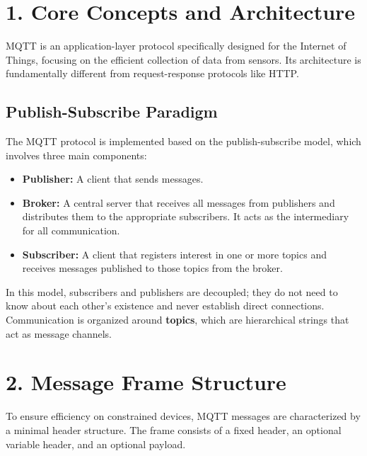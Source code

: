 \documentclass[a4paper, 12pt]{book} %
\begin{document}
\section{1. Core Concepts and
Architecture}\label{core-concepts-and-architecture}

MQTT is an application-layer protocol specifically designed for the
Internet of Things, focusing on the efficient collection of data from
sensors. Its architecture is fundamentally different from
request-response protocols like HTTP.

\subsection{Publish-Subscribe
Paradigm}\label{publish-subscribe-paradigm}

The MQTT protocol is implemented based on the publish-subscribe model,
which involves three main components:

\begin{itemize}
\tightlist
\item
  \textbf{Publisher:} A client that sends messages.
\item
  \textbf{Broker:} A central server that receives all messages from
  publishers and distributes them to the appropriate subscribers. It
  acts as the intermediary for all communication.
\item
  \textbf{Subscriber:} A client that registers interest in one or more
  topics and receives messages published to those topics from the
  broker.
\end{itemize}

In this model, subscribers and publishers are decoupled; they do not
need to know about each other's existence and never establish direct
connections. Communication is organized around \textbf{topics}, which
are hierarchical strings that act as message channels.

\section{2. Message Frame Structure}\label{message-frame-structure}

To ensure efficiency on constrained devices, MQTT messages are
characterized by a minimal header structure. The frame consists of a
fixed header, an optional variable header, and an optional payload.
\end{document}
